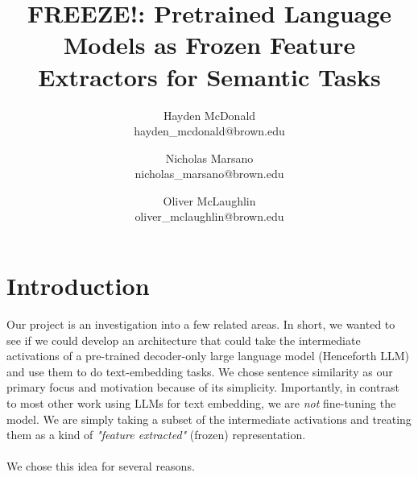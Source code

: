 \documentclass[14pt]{article}
\title{FREEZE!: Pretrained Language Models as Frozen Feature Extractors for Semantic Tasks}
\author{
    Hayden McDonald\\hayden\_mcdonald@brown.edu \and 
    Nicholas Marsano\\nicholas\_marsano@brown.edu\and 
    Oliver McLaughlin\\oliver\_mclaughlin@brown.edu
}
\begin{document}
\maketitle


\newpage

\section{Introduction}
Our project is an investigation into a few related areas. In short, we wanted to see if we could develop an architecture that could take the intermediate activations of a pre-trained decoder-only large language model (Henceforth LLM) and use them to do text-embedding tasks. We chose sentence similarity as our primary focus and motivation because of its simplicity. Importantly, in contrast to most other work using LLMs for text embedding, we are \textit{not} fine-tuning the model. We are simply taking a subset of the intermediate activations and treating them as a kind of \textit{"feature extracted"} (frozen) representation.\\\\
We chose this idea for several reasons.
\end{document}
